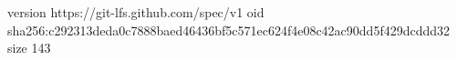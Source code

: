 version https://git-lfs.github.com/spec/v1
oid sha256:c292313deda0c7888baed46436bf5c571ec624f4e08c42ac90dd5f429dcddd32
size 143
